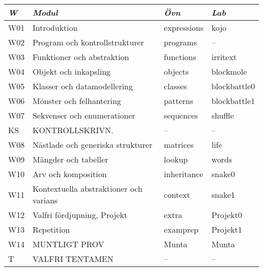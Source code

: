 \begin{tabular}{l|l|l|l}
\textit{W} & \textit{Modul} & \textit{Övn} & \textit{Lab} \\ \hline \hline
W01 & Introduktion & expressions & kojo \\
W02 & Program och kontrollstrukturer & programs & -- \\
W03 & Funktioner och abstraktion & functions & irritext \\
W04 & Objekt och inkapsling & objects & blockmole \\
W05 & Klasser och datamodellering & classes & blockbattle0 \\
W06 & Mönster och felhantering & patterns & blockbattle1 \\
W07 & Sekvenser och enumerationer & sequences & shuffle \\
KS & KONTROLLSKRIVN. & -- & -- \\
W08 & Nästlade och generiska strukturer & matrices & life \\
W09 & Mängder och tabeller & lookup & words \\
W10 & Arv och komposition & inheritance & snake0 \\
W11 & Kontextuella abstraktioner och varians & context & snake1 \\
W12 & Valfri fördjupning, Projekt & extra & Projekt0 \\
W13 & Repetition & examprep & Projekt1 \\
W14 & MUNTLIGT PROV & Munta & Munta \\
T & VALFRI TENTAMEN & -- & -- \\
\end{tabular}
